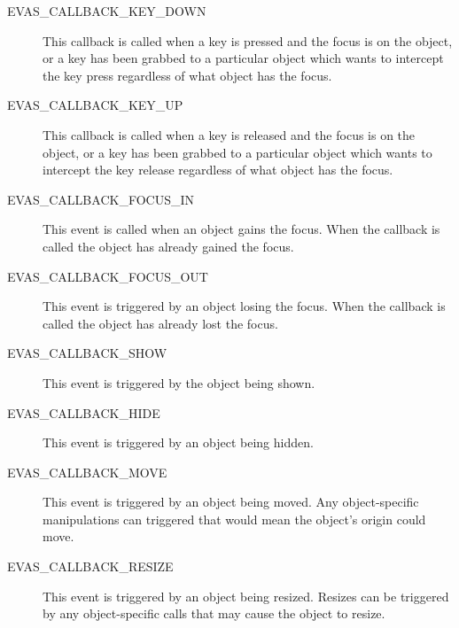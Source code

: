 \documentclass[a4paper]{profusion}
\begin{document}
\begin{description}
\item[EVAS\_CALLBACK\_KEY\_DOWN] This callback is called when a key is
  pressed and the focus is on the object, or a key has been grabbed to
  a particular object which wants to intercept the key press
  regardless of what object has the focus.

\item[EVAS\_CALLBACK\_KEY\_UP] This callback is called when a key is
  released and the focus is on the object, or a key has been grabbed
  to a particular object which wants to intercept the key release
  regardless of what object has the focus.

\item[EVAS\_CALLBACK\_FOCUS\_IN] This event is called when an object
  gains the focus. When the callback is called the object has already
  gained the focus.

\item[EVAS\_CALLBACK\_FOCUS\_OUT] This event is triggered by an object
  losing the focus. When the callback is called the object has already
  lost the focus.

\item[EVAS\_CALLBACK\_SHOW] This event is triggered by the object
  being shown.

\item[EVAS\_CALLBACK\_HIDE] This event is triggered by an object being
  hidden.

\item[EVAS\_CALLBACK\_MOVE] This event is triggered by an object being
  moved.  Any object-specific manipulations can triggered that would
  mean the object's origin could move.

\item[EVAS\_CALLBACK\_RESIZE] This event is triggered by an object
  being resized. Resizes can be triggered by any object-specific calls
  that may cause the object to resize.






\end{description}
\end{document}
